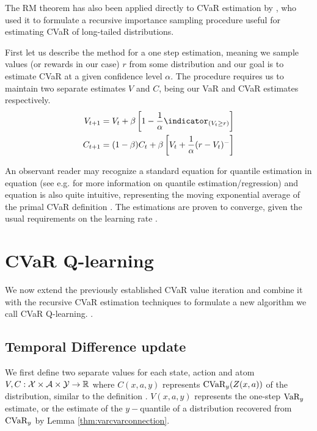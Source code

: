 The RM theorem has also been applied directly to CVaR estimation by \citet{bardou2009recursive}, who used it to formulate a recursive importance sampling procedure useful for estimating CVaR of long-tailed distributions.

First let us describe the method for a one step estimation, meaning we sample values (or rewards in our case) $r$ from some distribution and our goal is to estimate CVaR at a given confidence level $\alpha$. The procedure requires us to maintain two separate estimates $V$ and $C$, being our VaR and CVaR estimates respectively.
\begin{align}
V_{t+1} &= V_{t} + \beta \bsquare{1-\dfrac{1}{\alpha}\indicator_{(V_t \ge r)}}\label{eqn:varestimate}\\
C_{t+1} &= (1-\beta)C_t + \beta \bsquare{V_t + \dfrac{1}{\alpha}(r-V_t)^-}\label{eqn:cvarestimate}
\end{align}

An observant reader may recognize a standard equation for quantile estimation in equation  (see e.g. \citet{koenker2001quantile} for more information on quantile estimation/regression) and equation  is also quite intuitive, representing the moving exponential average of the primal CVaR definition . The estimations are proven to converge, given the usual requirements on the learning rate  \citep{bardou2009recursive}.


\section{CVaR Q-learning}\label{sec:qcvar}

We now extend the previously established CVaR value iteration and combine it with the recursive CVaR estimation techniques to formulate a new algorithm we call CVaR Q-learning. .
\subsection{Temporal Difference update}
We first define two separate values for each state, action and atom $V, C: \mathcal{X}\times\mathcal{A}\times\mathcal{Y}\to\mathbb{R}$ where $C(x, a, y)$ represents $\text{CVaR}_y(Z(x, a))$ of the distribution, similar to the definition . $V(x, a, y)$ represents the one-step $\text{VaR}_y$ estimate, or the estimate of the $y-$quantile of a distribution recovered from $\text{CVaR}_y$ by Lemma \ref{thm:varcvarconnection}.

